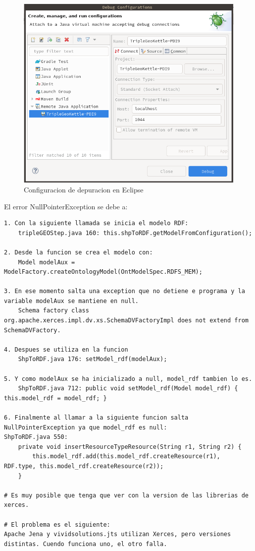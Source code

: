 \begin{figure}[H]
    \includegraphics[width=\textwidth]{images/debug-configurations.png}
    \centering
    \caption{Configuracion de depuracion en Eclipse}
    \label{fig:debug-configurations}
\end{figure}

El error NullPointerException se debe a:

\begin{lstlisting}
1. Con la siguiente llamada se inicia el modelo RDF:
    tripleGEOStep.java 160: this.shpToRDF.getModelFromConfiguration();

2. Desde la funcion se crea el modelo con:
    Model modelAux = ModelFactory.createOntologyModel(OntModelSpec.RDFS_MEM);

3. En ese momento salta una exception que no detiene e programa y la variable modelAux se mantiene en null.
    Schema factory class org.apache.xerces.impl.dv.xs.SchemaDVFactoryImpl does not extend from SchemaDVFactory.

4. Despues se utiliza en la funcion
    ShpToRDF.java 176: setModel_rdf(modelAux);

5. Y como modelAux se ha inicializado a null, model_rdf tambien lo es.
    ShpToRDF.java 712: public void setModel_rdf(Model model_rdf) { this.model_rdf = model_rdf; }

6. Finalmente al llamar a la siguiente funcion salta NullPointerException ya que model_rdf es null:
ShpToRDF.java 550:
	private void insertResourceTypeResource(String r1, String r2) {
		this.model_rdf.add(this.model_rdf.createResource(r1), RDF.type, this.model_rdf.createResource(r2));
	}

# Es muy posible que tenga que ver con la version de las librerias de xerces.

# El problema es el siguiente:
Apache Jena y vividsolutions.jts utilizan Xerces, pero versiones distintas. Cuendo funciona uno, el otro falla.

\end{lstlisting}


